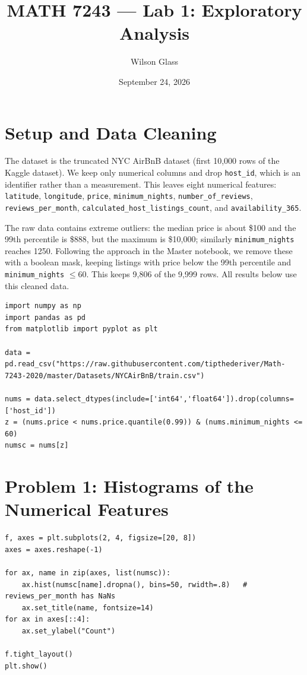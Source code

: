 \documentclass[11pt]{article}
\title{MATH 7243 --- Lab 1: Exploratory Analysis}
\author{Wilson Glass}
\date{September 24, 2026}
\begin{document}
\maketitle

\section*{Setup and Data Cleaning}

The dataset is the truncated NYC AirBnB dataset (first 10{,}000 rows of the Kaggle
dataset). We keep only numerical columns and drop \texttt{host\_id}, which is an
identifier rather than a measurement. This leaves eight numerical features:
\texttt{latitude}, \texttt{longitude}, \texttt{price}, \texttt{minimum\_nights},
\texttt{number\_of\_reviews}, \texttt{reviews\_per\_month},
\texttt{calculated\_host\_listings\_count}, and \texttt{availability\_365}.

The raw data contains extreme outliers: the median price is about \$100 and the 99th
percentile is \$888, but the maximum is \$10{,}000; similarly \texttt{minimum\_nights}
reaches 1250. Following the approach in the Master notebook, we remove these with a
boolean mask, keeping listings with price below the 99th percentile and
\texttt{minimum\_nights} $\le 60$. This keeps 9{,}806 of the 9{,}999 rows. All results
below use this cleaned data.

\begin{lstlisting}
import numpy as np
import pandas as pd
from matplotlib import pyplot as plt

data = pd.read_csv("https://raw.githubusercontent.com/tipthederiver/Math-7243-2020/master/Datasets/NYCAirBnB/train.csv")

nums = data.select_dtypes(include=['int64','float64']).drop(columns=['host_id'])
z = (nums.price < nums.price.quantile(0.99)) & (nums.minimum_nights <= 60)
numsc = nums[z]
\end{lstlisting}

\section*{Problem 1: Histograms of the Numerical Features}

\begin{lstlisting}
f, axes = plt.subplots(2, 4, figsize=[20, 8])
axes = axes.reshape(-1)

for ax, name in zip(axes, list(numsc)):
    ax.hist(numsc[name].dropna(), bins=50, rwidth=.8)   # reviews_per_month has NaNs
    ax.set_title(name, fontsize=14)
for ax in axes[::4]:
    ax.set_ylabel("Count")

f.tight_layout()
plt.show()
\end{lstlisting}
\end{document}

